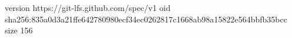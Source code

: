 version https://git-lfs.github.com/spec/v1
oid sha256:835a0d3a21ffe642780980ecf34ec0262817c1668ab98a15822e564bbfb35bcc
size 156
